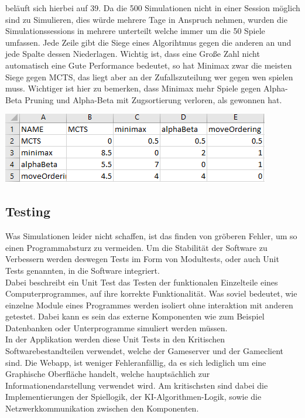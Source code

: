 \documentclass[12pt,a4paper,bibliography=totocnumbered,listof=totocnumbered]{article}
\begin{document}
beläuft sich hierbei auf 39. Da die 500 Simulationen nicht in einer Session möglich sind zu Simulieren, dies würde mehrere Tage in Anspruch nehmen,
wurden die Simulationssessions in mehrere unterteilt welche immer um die 50 Spiele umfassen.
Jede Zeile gibt die Siege eines Algorihtmus gegen die anderen an und jede Spalte dessen Niederlagen.
Wichtig ist, dass eine Große Zahl nicht automatisch eine Gute Performance bedeutet, so hat Minimax zwar die meisten
Siege gegen MCTS, das liegt aber an der Zufallszuteilung wer gegen wen spielen muss. Wichtiger ist hier zu bemerken, dass Minimax mehr Spiele 
gegen Alpha-Beta Pruning und Alpha-Beta mit Zugsortierung verloren, als gewonnen hat.


\vspace{1em}
\begin{minipage}{\linewidth}
	\centering
	\includegraphics[width=0.7\linewidth]{pics/ExcelSimulation.png}
	\label{fig:ExcelSimulation}
\end{minipage}


\subsection{Testing}
Was Simulationen leider nicht schaffen, ist das finden von gröberen Fehler, um so einen Programmabsturz zu vermeiden.
Um die Stabilität der Software zu Verbessern werden deswegen Tests im Form von Modultests, oder auch Unit Tests genannten, in die Software integriert.
\\
Dabei beschreibt ein Unit Test das Testen der funktionalen Einzelteile eines Computerprogrammes, auf ihre korrekte Funktionalität. 
Was soviel bedeutet, wie einzelne Module eines Programmes werden isoliert ohne interaktion mit anderen getestet. 
Dabei kann es sein das externe Komponenten wie zum Beispiel Datenbanken oder Unterprogramme simuliert werden müssen. \cite{UnitTestBook}
\\
In der Applikation werden diese Unit Tests in den Kritischen Softwarebestandteilen verwendet, welche der Gameserver und der Gameclient sind.
Die Webapp, ist weniger Fehleranfällig, da es sich lediglich um eine Graphische Oberfläche handelt, welche hauptsächlich zur Informationendarstellung verwendet wird.
Am kritischsten sind dabei die Implementierungen der Spiellogik, der KI-Algorithmen-Logik, sowie die Netzwerkkommunikation zwischen den Komponenten. 
\end{document}
